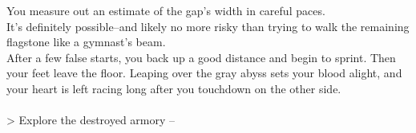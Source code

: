 You measure out an estimate of the gap's width in careful paces.\\

It's definitely possible--and likely no more risky than trying to walk the remaining flagstone like a gymnast's beam.\\

After a few false starts, you back up a good distance and begin to sprint. Then your feet leave the floor. Leaping over the gray abyss sets your blood alight, and your heart is left racing long after you touchdown on the other side.\\
\\

> Explore the destroyed armory -- 